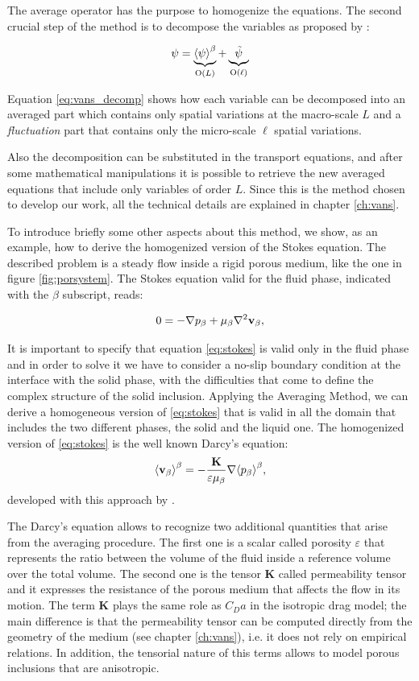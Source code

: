 The average operator has the purpose to homogenize the equations. The second crucial step of the method is to decompose the variables as proposed by \citet{gray1975derivation}:

\begin{equation}
\psi =   \underbrace{ {\left< \psi \right>}^{\beta} }_\text{O($L$)}  +  \underbrace{\tilde{\psi} }_\text{O($\ell$)}
\label{eq:vans_decomp}
\end{equation}

\noindent Equation \eqref{eq:vans_decomp} shows how each variable can be decomposed into an averaged part which contains only spatial variations at the macro-scale $L$ and a \textit{fluctuation} part that contains only the micro-scale $\ell$ spatial variations.

Also the decomposition can be substituted in the transport equations, and after some mathematical manipulations it is possible to retrieve the new averaged equations that include only variables of order $L$.
Since this is the method chosen to develop our work, all the technical details are explained in chapter \ref{ch:vans}.

To introduce briefly some other aspects about this method, we show, as an example, how to derive the homogenized version of the Stokes equation. The described problem is a steady flow inside a rigid porous medium, like the one in figure \ref{fig:porsystem}.
The Stokes equation valid for the fluid phase, indicated with the $\beta$ subscript, reads:

\begin{equation}
0 = - \nabla p_{\beta} +\mu_{\beta} \nabla^2 \textbf{v}_{\beta},
\label{eq:stokes}
\end{equation} 

It is important to specify that equation \eqref{eq:stokes} is valid only in the fluid phase and in order to solve it we have to consider a no-slip boundary condition at the interface with the solid phase, with the difficulties that come to define the complex structure of the solid inclusion.
Applying the Averaging Method, we can derive a homogeneous version of \eqref{eq:stokes} that is valid in all the domain that includes the two different phases, the solid and the liquid one.
The homogenized version of \eqref{eq:stokes} is the well known Darcy's equation:
$${\left< \textbf{v}_{\beta} \right>}^{\beta} = -\dfrac{ \mathbf{K} }{\varepsilon \mu_{\beta}} \nabla {\left< p_{\beta} \right>}^{\beta},$$
developed with this approach by  \citet{whitaker1986flow}.

The Darcy's equation allows to recognize two additional quantities that arise from the averaging procedure. The first one is a scalar called porosity $\varepsilon$ that represents the ratio between the volume of the fluid inside a reference volume over the total volume.
The second one is the tensor $\mathbf{K}$ called permeability tensor and it expresses the resistance of the porous medium that affects the flow in its motion.
The term $\mathbf{K}$ plays the same role as $C_D a$ in the isotropic drag model; the main difference is that the permeability tensor can be computed directly from the geometry of the medium (see chapter \ref{ch:vans}), i.e. it does not rely on empirical relations.
In addition, the tensorial nature of this terms allows to model porous inclusions that are anisotropic.


